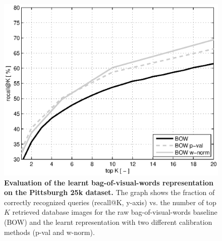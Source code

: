     \begin{figure}[]
        \centering
        \includegraphics[width=1.1\linewidth]{imgs/plotPitt25kBOW.eps}  
        \caption{
            \textbf{Evaluation of the learnt bag-of-visual-words representation on the Pittsburgh 25k \cite{Gronat13} dataset.} The graph shows the fraction of correctly recognized queries (recall@K, y-axis) vs. the number of top $K$ retrieved database images for the raw bag-of-visual-words baseline (BOW) and the learnt representation with two different calibration methods (p-val and w-norm).
        }
        \label{fig:recallBOW}
    \end{figure}
